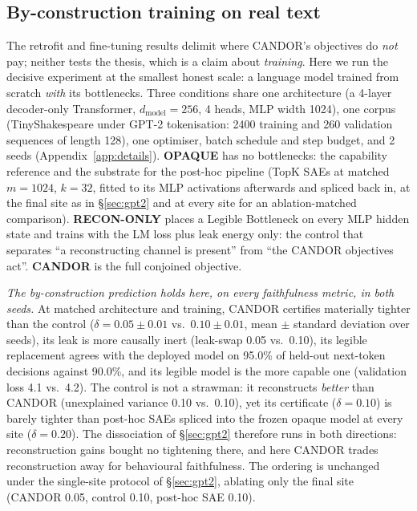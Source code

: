 \documentclass[11pt]{article}
\providecommand{\lmLayers}{4}\providecommand{\lmDModel}{256}\providecommand{\lmHeads}{4}
\providecommand{\lmDMlp}{1024}\providecommand{\lmDictM}{1024}\providecommand{\lmTopK}{32}
\providecommand{\lmSeqLen}{128}\providecommand{\lmSteps}{4000}\providecommand{\lmBatch}{32}
\providecommand{\lmSeeds}{2}\providecommand{\lmTrainSeqs}{2400}\providecommand{\lmValSeqs}{260}
\providecommand{\lmReconDelta}{0.10}\providecommand{\lmReconDeltaStd}{0.01}
\providecommand{\lmReconSwap}{0.10}\providecommand{\lmReconSwapStd}{0.01}
\providecommand{\lmReconLegLoss}{4.2}\providecommand{\lmReconAgree}{90.0}
\providecommand{\lmReconRecon}{0.10}
\providecommand{\lmCandorDelta}{0.05}\providecommand{\lmCandorDeltaStd}{0.01}
\providecommand{\lmCandorSwap}{0.05}\providecommand{\lmCandorSwapStd}{0.01}
\providecommand{\lmCandorLegLoss}{4.1}\providecommand{\lmCandorAgree}{95.0}
\providecommand{\lmCandorRecon}{0.10}
\providecommand{\lmSaeFinalDelta}{0.10}\providecommand{\lmSaeFinalDeltaStd}{0.01}
\providecommand{\lmSaeAllDelta}{0.20}\providecommand{\lmSaeAllDeltaStd}{0.01}
\providecommand{\lmReconFinalDelta}{0.10}\providecommand{\lmCandorFinalDelta}{0.05}
\begin{document}
\subsection{By-construction training on real text}
\label{sec:scratch}
The retrofit and fine-tuning results delimit where CANDOR's objectives do \emph{not}
pay; neither tests the thesis, which is a claim about \emph{training}. Here we run
the decisive experiment at the smallest honest scale: a language model trained from
scratch \emph{with} its bottlenecks. Three conditions share one architecture (a
\lmLayers-layer decoder-only Transformer, $d_{\mathrm{model}}=\lmDModel$, \lmHeads{}
heads, MLP width \lmDMlp), one corpus (TinyShakespeare under GPT-2 tokenisation:
\lmTrainSeqs{} training and \lmValSeqs{} validation sequences of length \lmSeqLen),
one optimiser, batch schedule and step budget, and \lmSeeds{} seeds
(Appendix~\ref{app:details}). \textbf{OPAQUE} has no bottlenecks: the capability
reference and the substrate for the post-hoc pipeline (TopK SAEs at matched
$m=\lmDictM$, $k=\lmTopK$, fitted to its MLP activations afterwards and spliced back
in, at the final site as in \S\ref{sec:gpt2} and at every site for an
ablation-matched comparison). \textbf{RECON-ONLY} places a Legible Bottleneck on
every MLP hidden state and trains with the LM loss plus leak energy only: the
control that separates ``a reconstructing channel is present'' from ``the CANDOR
objectives act''. \textbf{CANDOR} is the full conjoined objective.

\emph{The by-construction prediction holds here, on every faithfulness metric, in
both seeds.} At matched architecture and training, CANDOR certifies materially
tighter than the control ($\delta=\lmCandorDelta\pm\lmCandorDeltaStd$ vs.\
$\lmReconDelta\pm\lmReconDeltaStd$, mean $\pm$ standard deviation over seeds), its
leak is more causally inert (leak-swap \lmCandorSwap{} vs.\ \lmReconSwap), its
legible replacement agrees with the deployed model on \lmCandorAgree\% of held-out
next-token decisions against \lmReconAgree\%, and its legible model is the more
capable one (validation loss \lmCandorLegLoss{} vs.\ \lmReconLegLoss). The control
is not a strawman: it reconstructs \emph{better} than CANDOR (unexplained variance
\lmReconRecon{} vs.\ \lmCandorRecon), yet its certificate ($\delta=\lmReconDelta$)
is barely tighter than post-hoc SAEs spliced into the frozen opaque model at every
site ($\delta=\lmSaeAllDelta$). The dissociation of \S\ref{sec:gpt2} therefore runs
in both directions: reconstruction gains bought no tightening there, and here CANDOR
trades reconstruction away for behavioural faithfulness. The ordering is unchanged
under the single-site protocol of \S\ref{sec:gpt2}, ablating only the final site
(CANDOR \lmCandorFinalDelta{}, control \lmReconFinalDelta{}, post-hoc SAE
\lmSaeFinalDelta).
\end{document}
